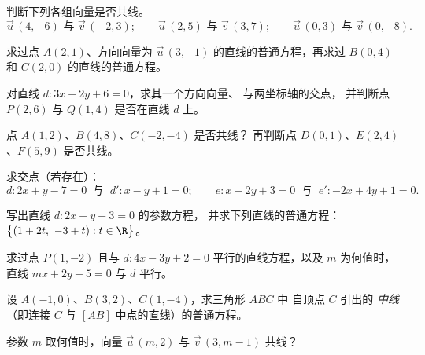 \begin{exercise}[$\star$]\label{exo:g11:vect:2}
判断下列各组向量是否共线。
\[
\vec u\,(4, -6) \text{ 与 } \vec v\,(-2, 3); \qquad
\vec u\,(2, 5) \text{ 与 } \vec v\,(3, 7); \qquad
\vec u\,(0, 3) \text{ 与 } \vec v\,(0, -8).
\]
\end{exercise}

\begin{exercise}[$\star$]\label{exo:g11:vect:3}
求过点 $A(2, 1)$、方向向量为
$\vec u\,(3, -1)$ 的直线的普通方程，再求过 $B(0, 4)$ 和
$C(2, 0)$ 的直线的普通方程。
\end{exercise}

\begin{exercise}[$\star$]\label{exo:g11:vect:4}
对直线 $d: 3x - 2y + 6 = 0$，求其一个方向向量、
与两坐标轴的交点，
并判断点 $P(2, 6)$ 与 $Q(1, 4)$ 是否在直线 $d$ 上。
\end{exercise}

\begin{exercise}[$\star\star$]\label{exo:g11:vect:5}
点 $A(1, 2)$、$B(4, 8)$、$C(-2, -4)$ 是否共线？
再判断点 $D(0, 1)$、$E(2, 4)$、$F(5, 9)$ 是否共线。
\end{exercise}

\begin{exercise}[$\star\star$]\label{exo:g11:vect:6}
求交点（若存在）：
\[
d: 2x + y - 7 = 0 \ \text{ 与 }\ d': x - y + 1 = 0;
\qquad
e: x - 2y + 3 = 0 \ \text{ 与 }\ e': -2x + 4y + 1 = 0 .
\]
\end{exercise}

\begin{exercise}[$\star\star$]\label{exo:g11:vect:7}
写出直线 $d: 2x - y + 3 = 0$ 的参数方程，
并求下列直线的普通方程：
$\bigl\{(1 + 2t,\ -3 + t) : t \in \R\bigr\}$。
\end{exercise}

\begin{exercise}[$\star\star$]\label{exo:g11:vect:8}
求过点 $P(1, -2)$ 且与
$d: 4x - 3y + 2 = 0$ 平行的直线方程，以及 $m$ 为何值时，直线
$mx + 2y - 5 = 0$ 与 $d$ 平行。
\end{exercise}

\begin{exercise}[$\star\star$]\label{exo:g11:vect:9}
设 $A(-1, 0)$、$B(3, 2)$、$C(1, -4)$，求三角形 $ABC$ 中
自顶点 $C$ 引出的 \emph{中线}（即连接 $C$
与 $[AB]$ 中点的直线）的普通方程。
\end{exercise}

\begin{exercise}[$\star\star$]\label{exo:g11:vect:10}
参数 $m$ 取何值时，向量
$\vec u\,(m, 2)$ 与 $\vec v\,(3, m - 1)$ 共线？
\end{exercise}

